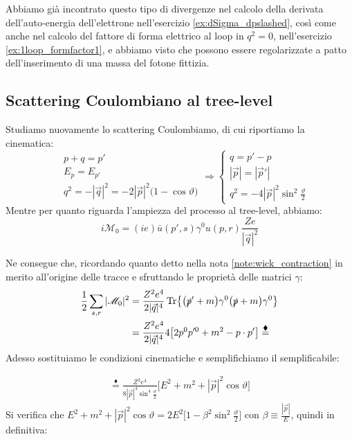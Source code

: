 \documentclass[../main.tex]{subfiles}
\begin{document}
Abbiamo già incontrato questo tipo di divergenze nel calcolo della derivata dell'auto-energia dell'elettrone nell'esercizio \ref{ex:dSigma_dpslashed}, così come anche nel calcolo del fattore di forma elettrico al loop in $q^2=0$, nell'esercizio \ref{ex:1loop_formfactor1}, e abbiamo visto che possono essere regolarizzate a patto dell'inserimento di una massa del fotone fittizia.

\subsection{Scattering Coulombiano al tree-level}
Studiamo nuovamente lo scattering Coulombiamo, di cui riportiamo la cinematica:
\[
\begin{aligned}
&p+q=p' \\
&E_p = E_{p'} \\\
&q^2=-|\Vec q|^2 = -2|\Vec p|^2\big(1-\cos\vartheta\big)
\end{aligned}
\Rightarrow
\begin{cases}
q = p' - p \\
|\Vec p| = |\Vec p'|\\
\boxed{q^2 = -4|\Vec p|^2 \sin^2\frac{\vartheta}{2}} 
\end{cases}
\]
Mentre per quanto riguarda l'ampiezza del processo al tree-level, abbiamo:
\[
\boxed{i\mathscr M_0  = (ie)\bar u (p',s)\gamma^0 u (p,r) \frac{Ze}{|\Vec{q}|^2}}
\]

Ne consegue che, ricordando quanto detto nella nota \ref{note:wick_contraction} in merito all'origine delle tracce e sfruttando le proprietà delle matrici $\gamma$:
\begin{align*}
    \frac{1}{2}\sum_{s,r}|\mathscr M_0|^2 &= \frac{Z^2e^4}{2|\Vec{q}|^4}\Tr{\big(\slashed p' + m\big)\gamma^0 \big(\slashed p + m\big)\gamma^0}\\
    &=\frac{Z^2e^4}{2|\Vec{q}|^4}4\big[2p^0p'^0 + m^2-p\cdot p'\big] \overset{\blacklozenge}{=}
\end{align*}
Adesso sostituiamo le condizioni cinematiche e semplifichiamo il semplificabile:

\begin{align*}
    \overset{\blacklozenge}{=}\frac{Z^2e^4}{8|\Vec p|^4 \sin^4\frac{\vartheta}{2}}\big[E^2 + m^2 + |\Vec{p}|^2 \cos\vartheta\big] 
\end{align*}
Si verifica che \(E^2 + m^2 + |\Vec{p}|^2 \cos\vartheta = 2E^2\big[ 1 - \beta^2\sin^2\frac{\vartheta}{2} \big]\) con \(\beta\equiv \frac{|\Vec{p}|}{E}\), quindi in definitiva:
\end{document}
